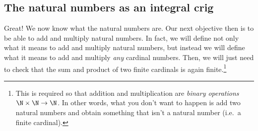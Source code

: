 \subsection{The natural numbers as an integral crig}

Great!  We now know what the natural numbers are.  Our next objective then is to be able to add and multiply natural numbers.  In fact, we will define not only what it means to add and multiply natural numbers, but instead we will define what it means to add and multiply \emph{any} cardinal numbers.  Then, we will just need to check that the sum and product of two finite cardinals is again finite.\footnote{This is required so that addition and multiplication are \emph{binary operations} $\N \times \N \rightarrow \N$.  In other words, what you don't want to happen is add two natural numbers and obtain something that isn't a natural number (i.e.~a finite cardinal).}
